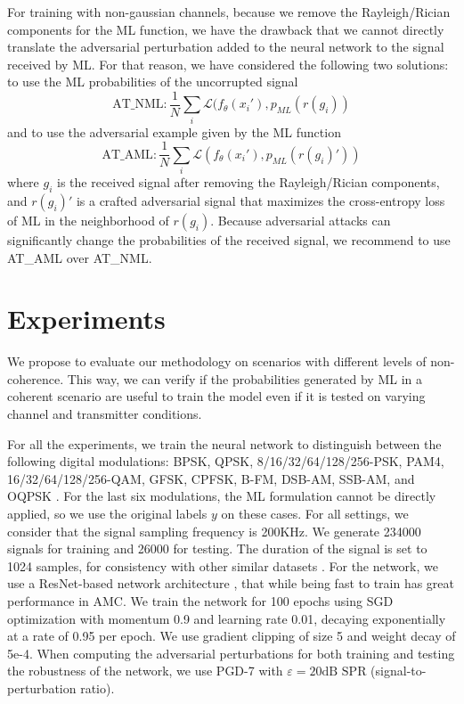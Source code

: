 \documentclass[conference]{IEEEtran}
\newcommand{\pf}[1]{{\textcolor{orange}{PF: {#1}}}}
\newcommand{\Ls}{\mathcal{L}}
\begin{document}
For training with non-gaussian channels, because we remove the Rayleigh/Rician components for the ML function, we have the drawback that we cannot directly translate the adversarial perturbation added to the neural network to the signal received by ML. For that reason, we have considered the following two solutions: to use the ML probabilities of the uncorrupted signal
\begin{equation}
    \text{AT\_NML} : \dfrac{1}{N}\sum_{i}\Ls(f_{\theta}(x_i'), p_{ML}(r(g_i))
\label{eq:at_nml}
\end{equation}
and to use the adversarial example given by the ML function
\begin{equation}
    \text{AT\_AML} : \dfrac{1}{N}\sum_{i}\Ls(f_{\theta}(x_i'), p_{ML}(r(g_i)'))
	\label{eq:at_aml}
\end{equation}
where $g_i$ is the received signal after removing the Rayleigh/Rician components, and $r(g_i)'$ is a crafted adversarial signal that maximizes the cross-entropy loss of ML in the neighborhood of $r(g_i)$.
Because adversarial attacks can significantly change the probabilities of the received signal, we recommend to use AT\_AML over AT\_NML.


\section{Experiments}
\label{sec:experiments}



We propose to evaluate our methodology on scenarios with different levels of non-coherence. This way, we can verify if the probabilities generated by ML in a coherent scenario are useful to train the model even if it is tested on varying channel and transmitter conditions. 

For all the experiments, we train the neural network to distinguish between the following digital modulations: BPSK, QPSK, 8/16/32/64/128/256-PSK, PAM4, 16/32/64/128/256-QAM, GFSK, CPFSK, B-FM, DSB-AM, SSB-AM, and OQPSK \cite{Rajendran_Meert_Giustiniano_Lenders_Pollin_2018,Guo_Jiang_Wu_Zhou_2020}. For the last six modulations, the ML formulation cannot be directly applied, so we use the original labels $y$ on these cases.
For all settings, we consider that the signal sampling frequency is 200KHz. We generate 234000 signals for training and 26000 for testing. The duration of the signal is set to 1024 samples, for consistency with other similar datasets \cite{OShea_West_2016}. For the network, we use a ResNet-based network architecture \cite{OShea_Roy_Clancy_2018}, that while being fast to train has great performance in AMC. We train the network for 100 epochs using SGD optimization with momentum 0.9 and learning rate 0.01, decaying exponentially at a rate of 0.95 per epoch. We use gradient clipping of size 5 and weight decay of 5e-4. When computing the adversarial perturbations for both training and testing the robustness of the network, we use PGD-7 with $\varepsilon=20 \text{dB SPR}$ (signal-to-perturbation ratio).
\end{document}
